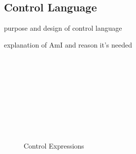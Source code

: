 \subsection{Control Language}
\label{sec:control-lang}

\todo purpose and design of control language

\todo explanation of AmI and reason it's needed

\begin{figure}
  \begin{syntax}
     \alternative{\CtrlFail}      \\
     \alternative{\RecvFrom{\ell}} \\
      \\
     \\
      \\
    \\
     \\
     \\

    \category[Systems]{\Pi}
  \end{syntax}

  \caption{Control Expressions}
  \label{fig:control-lang-syntax}
\end{figure}



